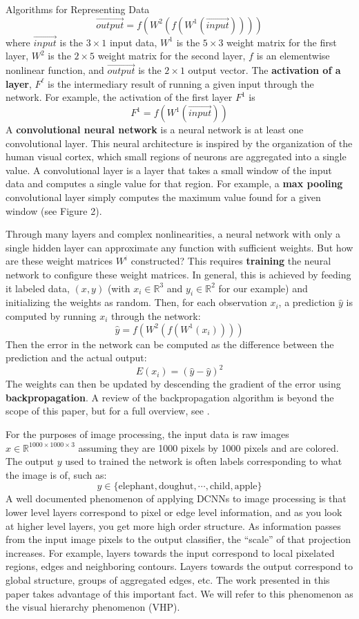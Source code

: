 \documentclass[12pt]{pom_thesis}
\begin{document}
\begin{chapter}{Algorithms for Representing Data}
$$\vec{output} = f(W^2(f(W^1(\vec{input}))))$$
where $\vec{input}$ is the $3 \times 1$ input data, $W^1$ is the $5 \times 3$ weight matrix for the first layer, $W^2$ is the $2 \times 5$ weight matrix for the second layer, $f$ is an elementwise nonlinear function, and $\vec{output}$ is the $2\times 1$ output vector. The \textbf{activation of a layer}, $F^\ell$ is the intermediary result of running a given input through the network. For example, the activation of the first layer $F^1$ is 
$$F^1= f(W^1(\vec{input}))$$
A \textbf{convolutional neural network} is a neural network is at least one convolutional layer. This neural architecture is inspired by the organization of the human visual cortex, which small regions of neurons are aggregated into a single value. A convolutional layer is a layer that takes a small window of the input data and computes a single value for that region. For example, a \textbf{max pooling} convolutional layer simply computes the maximum value found for a given window (see Figure 2).

Through many layers and complex nonlinearities, a neural network with only a single hidden layer can approximate any function \cite{hornik1991approximation} with sufficient weights. But how are these weight matrices $W^i$ constructed?  This requires \textbf{training} the neural network to configure these weight matrices. In general, this is achieved by feeding it labeled data, $(x,y)$ (with $x_i \in \mathbb{R}^3$ and $y_i \in \mathbb{R}^2$ for our example) and initializing the weights as random. Then, for each observation $x_i$, a prediction $\hat{y}$ is computed by running $x_i$ through the network:
$$\hat{y} = f(W^2(f(W^1(x_i))))$$
Then the error in the network can be computed as the difference between the prediction and the actual output:
$$E(x_i) = (\hat{y} - \hat{y})^2$$
The weights can then be updated by descending the gradient of the error using \textbf{backpropagation}.  A review of the backpropagation algorithm is beyond the scope of this paper, but for a full overview, see \cite{rumelhart1988learning}.

For the purposes of image processing, the input data is raw images $x \in \mathbb{R}^{1000 \times 1000 \times 3}$ assuming they are 1000 pixels by 1000 pixels and are colored. The output $y$ used to trained the network is often labels corresponding to what the image is of, such as: $$y \in \{\text{elephant}, \text{doughut}, \cdots, \text{child},\text{apple}  \}$$
A well documented phenomenon of applying DCNNs to image processing is that lower level layers correspond to pixel or edge level information, and as you look at higher level layers, you get more high order structure. As information passes from the input image pixels to the output classifier, the ``scale'' of that projection increases. For example, layers towards the input correspond to local pixelated regions, edges and neighboring contours. Layers towards the output correspond to global structure, groups of aggregated edges, etc.  The work presented in this paper takes advantage of this important fact.  We will refer to this phenomenon as the visual hierarchy phenomenon (VHP).

\end{chapter}
\end{document}
